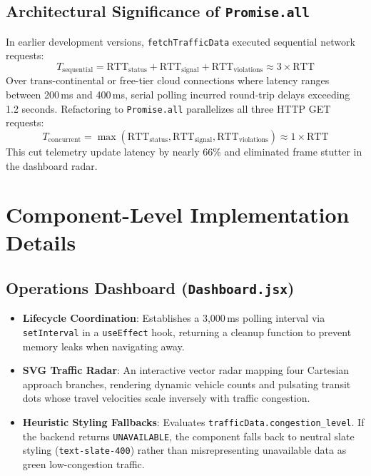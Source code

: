 \subsection{Architectural Significance of \texttt{Promise.all}}
In earlier development versions, \texttt{fetchTrafficData} executed sequential network requests:
\begin{equation}
T_{\text{sequential}} = \text{RTT}_{\text{status}} + \text{RTT}_{\text{signal}} + \text{RTT}_{\text{violations}} \approx 3 \times \text{RTT}
\end{equation}
Over trans-continental or free-tier cloud connections where latency ranges between 200\,ms and 400\,ms, serial polling incurred round-trip delays exceeding 1.2 seconds. Refactoring to \texttt{Promise.all} parallelizes all three HTTP GET requests:
\begin{equation}
T_{\text{concurrent}} = \max\left(\text{RTT}_{\text{status}}, \text{RTT}_{\text{signal}}, \text{RTT}_{\text{violations}}\right) \approx 1 \times \text{RTT}
\end{equation}
This cut telemetry update latency by nearly 66\% and eliminated frame stutter in the dashboard radar.

\section{Component-Level Implementation Details}

\subsection{Operations Dashboard (\texttt{Dashboard.jsx})}
\begin{itemize}[leftmargin=*]
    \item \textbf{Lifecycle Coordination}: Establishes a 3,000\,ms polling interval via \texttt{setInterval} in a \texttt{useEffect} hook, returning a cleanup function to prevent memory leaks when navigating away.
    \item \textbf{SVG Traffic Radar}: An interactive vector radar mapping four Cartesian approach branches, rendering dynamic vehicle counts and pulsating transit dots whose travel velocities scale inversely with traffic congestion.
    \item \textbf{Heuristic Styling Fallbacks}: Evaluates \texttt{trafficData.congestion\_level}. If the backend returns \texttt{UNAVAILABLE}, the component falls back to neutral slate styling (\texttt{text-slate-400}) rather than misrepresenting unavailable data as green low-congestion traffic.
\end{itemize}

